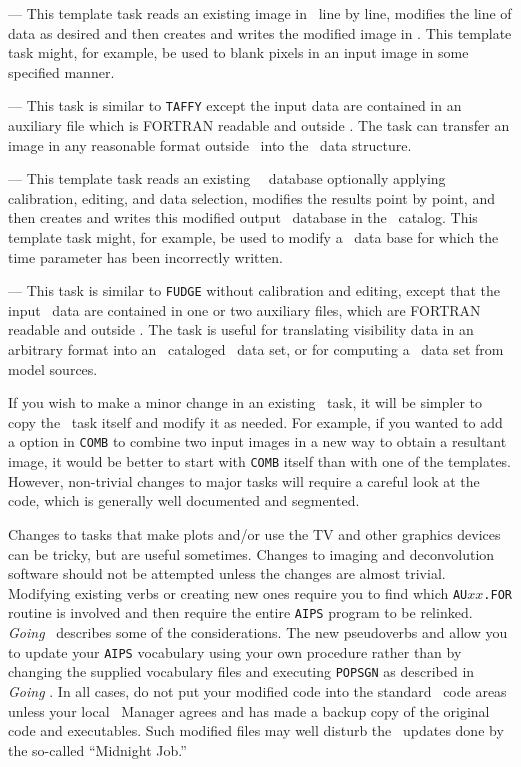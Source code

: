 {\tt {}} ---  This template task reads an existing image in
\AIPS\ line by line, modifies the line of data as desired and then
creates and writes the modified image in \hbox{\AIPS}.  This template
task might, for example, be used to blank pixels in an input image in
some specified manner.

{\tt {}} ---  This task is similar to {\tt TAFFY} except the
input data are contained in an auxiliary file which is FORTRAN
readable and outside \hbox{\AIPS}.  The task can transfer an image in
any reasonable format outside \AIPS\ into the \AIPS\ data structure.

{\tt {}} --- This template task reads an existing \AIPS\
\uv\ database optionally applying calibration, editing, and data
selection, modifies the results point by point, and then creates
and writes this modified output \uv\ database in the \AIPS\ catalog.
This template task might, for example, be used to modify a \uv\ data
base for which the time parameter has been incorrectly written.

{\tt {}} --- This task is similar to {\tt FUDGE} without
calibration and editing, except that the input \uv\ data are contained
in one or two auxiliary files, which are FORTRAN readable and outside
\AIPS\@.  The task is useful for translating visibility data in an
arbitrary format into an \AIPS\ cataloged \uv\ data set, or for
computing a \uv\ data set from model sources.

     If you wish to make a minor change in an existing \AIPS\ task, it
will be simpler to copy the \AIPS\ task itself and modify it as
needed.  For example, if you wanted to add a option in {\tt COMB} to
combine two input images in a new way to obtain a resultant image, it
would be better to start with {\tt COMB} itself than with one of the
templates.  However, non-trivial changes to major tasks will require a
careful look at the code, which is generally well documented and
segmented.

     Changes to tasks that make plots and/or use the TV and other
graphics devices can be tricky, but are useful sometimes.  Changes to
imaging and deconvolution software should not be attempted unless
the changes are almost trivial.  Modifying existing verbs or creating
new ones require you to find which {\tt AU$xx$.FOR} routine is
involved and then require the entire {\tt AIPS} program to be
relinked.  {\it Going\/} \AIPS\ describes some of the considerations.
The new pseudoverbs {\tt \tndx{VERB}} and {\tt \tndx{PSEUDOVB}} allow
you to update your {\tt AIPS} vocabulary using your own procedure
rather than by changing the supplied vocabulary files and executing
{\tt POPSGN} as described in {\it Going\/} \hbox{\AIPS}.  In all cases,
do not put your modified code into the standard \AIPS\ code areas
unless your local \AIPS\ Manager agrees and has made a backup copy of
the original code and executables.\iodx{Going AIPS} Such modified
files may well disturb the \AIPS\ updates done by the so-called
``Midnight Job.''

